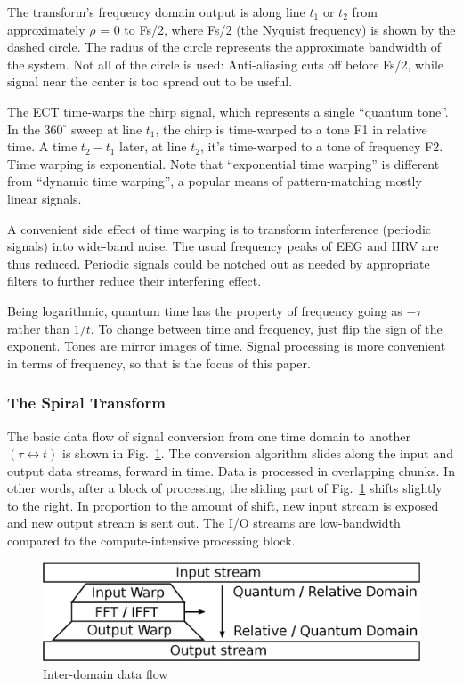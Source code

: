 The transform's frequency domain output is along line $t_1$ or $t_2$ from
approximately $\rho$ = 0 to Fs/2, where Fs/2 (the Nyquist frequency)
is shown by the dashed circle.
The radius of the circle represents the approximate bandwidth of the system.
Not all of the circle is used: Anti-aliasing cuts off before Fs/2, while signal
near the center is too spread out to be useful.

The ECT time-warps the chirp signal, which represents a single ``quantum tone''.
In the $360^{\circ}$ sweep at line $t_1$,
the chirp is time-warped to a tone F1 in relative time.
A time $t_2-t_1$ later, at line $t_2$,
it's time-warped to a tone of frequency F2.
Time warping is exponential.
Note that ``exponential time warping'' is different from ``dynamic time
warping'', a popular means of pattern-matching mostly linear signals.

A convenient side effect of time warping is to transform interference
(periodic signals) into wide-band noise.
The usual frequency peaks of EEG and HRV are thus reduced.
Periodic signals could be notched out as needed by appropriate filters
to further reduce their interfering effect.

Being logarithmic, quantum time has the property of frequency going as
$-\tau$ rather than $1/t$.
To change between time and frequency, just flip the sign of the exponent.
Tones are mirror images of time.
Signal processing is more convenient in terms of frequency,
so that is the focus of this paper.

\subsubsection{\label{sec:level1}The Spiral Transform}

The basic data flow of signal conversion from one time domain to another
$(\tau \leftrightarrow t)$ is shown in Fig.~\ref{fig:sled}.
The conversion algorithm slides along the input and output data streams,
forward in time.
Data is processed in overlapping chunks.
In other words, after a block of processing,
the sliding part of Fig.~\ref{fig:sled} shifts slightly to the right.
In proportion to the amount of shift,
new input stream is exposed and new output stream is sent out.
The I/O streams are low-bandwidth compared to the compute-intensive
processing block.

\begin{figure}
    \centering
    \includegraphics[width=0.95\linewidth]{../source/sled_e}
    \caption[Quantum to Relative Time Translation Flow]{Inter-domain data flow}
    \label{fig:sled}
\end{figure}

